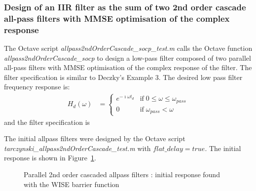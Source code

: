 \documentclass[a4paper,twoside,10pt,english]{report}
\begin{document}
\subsubsection{Design of an IIR filter as the sum of two 2nd order cascade all-pass filters with MMSE optimisation of the complex response}
The Octave script \emph{allpass2ndOrderCascade\_socp\_test.m} calls the
Octave function \emph{allpass2ndOrderCascade\_socp} to design a low-pass
filter composed of two parallel all-pass filters with MMSE optimisation of 
the complex response of the filter. The filter specification is similar to 
Deczky's Example 3. The desired low pass filter frequency response is:
\begin{align*}
H_{d}\left(\omega\right)&=\begin{cases}
e^{-\imath\omega t_{d}}&\text{if}\; 0\le\omega\le\omega_{pass}\\
0&\text{if}\;\omega_{pass}<\omega
\end{cases}
\end{align*}
and the filter specification is
\begin{small}

\end{small}
The initial allpass filters were designed by the Octave script 
\emph{tarczynski\_allpass2ndOrderCascade\_test.m} with $flat\_delay=true$. 
The initial response is shown in 
Figure~\ref{fig:Parallel-2nd-order-cascade-allpass-initial-response}.
\begin{figure}[!htbp]
\begin{center}
\scalebox{0.7}{}
\caption{Parallel 2nd order cascaded allpass filters : initial response found with the WISE barrier function}
\label{fig:Parallel-2nd-order-cascade-allpass-initial-response}
\end{center}
\end{figure}
\end{document}
